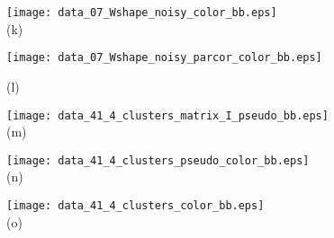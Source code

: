 \documentclass[journal]{vgtc}                %
\begin{document}
\begin{figure*}[ht!]
\begin{minipage}{0.27\textwidth}
     \texttt{[image: data\_07\_Wshape\_noisy\_color\_bb.eps]}\\

   \hspace{-0.18cm} \footnotesize (k) 
  \end{minipage}
  \hfill
  \begin{minipage}{0.20\textwidth}
   \centering

     \texttt{[image: data\_07\_Wshape\_noisy\_parcor\_color\_bb.eps]}\\ \vspace{0.4cm}

   \hspace{-0.20cm} \footnotesize (l) 
  \end{minipage}  

      \mbox{} \bigskip

  \begin{minipage}{0.23\textwidth}
   \centering

     \hspace{-0.3cm} \texttt{[image: data\_41\_4\_clusters\_matrix\_I\_pseudo\_bb.eps]}\\


   \hspace{-0.56cm}  \footnotesize (m) 
  \end{minipage}
  \hfill
  \begin{minipage}{0.23\textwidth}
   \centering

     \texttt{[image: data\_41\_4\_clusters\_pseudo\_color\_bb.eps]}\\
     
   \hspace{-0.31cm} \footnotesize (n) 
  \end{minipage}
  \hfill
  \begin{minipage}{0.27\textwidth}
   \centering

     \texttt{[image: data\_41\_4\_clusters\_color\_bb.eps]}\\
     
   \hspace{-0.18cm} \footnotesize (o) 
  \end{minipage}
  \hfill
  \begin{minipage}{0.20\textwidth}
   \centering


\end{minipage}
\end{figure*}
\end{document}
